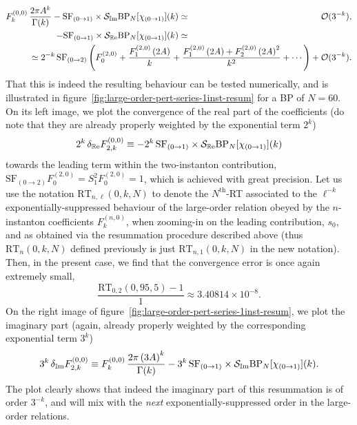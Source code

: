 \documentclass[11pt,a4paper]{article}
\newcommand{\CS}{{\cal S}}
\newcommand{\be}{\begin{equation}}
\newcommand{\ee}{\end{equation}}
\def\im{{\mathbb{I}}{\mathrm{m}}}
\def\re{{\mathbb{R}}{\mathrm{e}}}
\begin{document}
%
\begin{eqnarray}
F_k^{(0,0)}\, \frac{2\pi A^k}{\Gamma(k)} - \mathrm{SF}_{(0\rightarrow1)} \times \CS_{\im} \mathrm{BP}_{N} [\chi_{(0\rightarrow1)}] (k) &\simeq& \mathcal{O}(3^{-k}), \\
- \mathrm{SF}_{(0\rightarrow1)} \times \CS_{\re} \mathrm{BP}_{N} [\chi_{(0\rightarrow1)}] (k) &\simeq& \\
&&
\hspace{-188pt}
\simeq 2^{-k}\, \mathrm{SF}_{(0\rightarrow2)} \left( F_0^{(2,0)} + \frac{F_1^{(2,0)} \left( 2A \right)}{k} + \frac{F_1^{(2,0)} \left( 2A \right) + F_2^{(2,0)} \left( 2A \right)^2}{k^2} + \cdots \right) + \mathcal{O}(3^{-k}).
\nonumber
\end{eqnarray} 
%
\noindent
That this is indeed the resulting behaviour can be tested numerically, and is illustrated in figure~\ref{fig:large-order-pert-series-1inst-resum} for a BP of $N=60$. On its left image, we plot the convergence of the real part of the coefficients (do note that they are already properly weighted by the exponential term $2^k$)
%
\be
2^k\, \delta_{\re} F^{(0,0)}_{2,k} \equiv - 2^{k}\,\mathrm{SF}_{(0\rightarrow1)} \times \CS_{\re} \mathrm{BP}_{N} [\chi_{(0\rightarrow1)}] (k)
\ee
%
\noindent
towards the leading term within the two-instanton contribution, $\mathrm{SF}_{(0\rightarrow2)} F_0^{(2,0)} = S_1^2 F_0^{(2,0)} = 1$, which is achieved with great precision. Let us use the notation $\mathrm{RT}_{n,\ell}(0,k,N)$ to denote the $N^{\text{th}}$-RT associated to the $\ell^{-k}$ exponentially-suppressed behaviour of the large-order relation obeyed by the $n$-instanton coefficients $F_k^{(n,0)}$, when zooming-in on the leading contribution, $s_0$, and as obtained via the resummation procedure described above (thus $\mathrm{RT}_{n}(0,k,N)$ defined previously is just $\mathrm{RT}_{n,1}(0,k,N)$ in the new notation). Then, in the present case, we find that the convergence error is once again extremely small,
%
\be
\frac{\mathrm{RT}_{0,2}(0,95,5) - 1}{1} \approx 3.40814 \times 10^{-8}.
\ee
%
\noindent
On the right image of figure~\ref{fig:large-order-pert-series-1inst-resum}, we plot the imaginary part (again, already properly weighted by the corresponding exponential term $3^k$)
%
\be
3^k\, \delta_{\im} F^{(0,0)}_{2,k} \equiv F_k^{(0,0)}\, \frac{2\pi \left(3A\right)^k}{\Gamma(k)} - 3^{k}\, \mathrm{SF}_{(0\rightarrow1)} \times \CS_{\im} \mathrm{BP}_{N} [\chi_{(0\rightarrow1)}] (k).
\ee
%
\noindent
The plot clearly shows that indeed the imaginary part of this resummation is of order $3^{-k}$, and will mix with the \textit{next} exponentially-suppressed order in the large-order relations.
\end{document}
